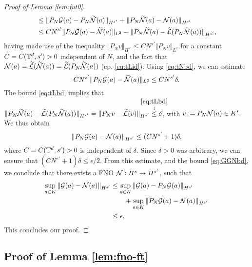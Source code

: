 \documentclass[reqno,a4paper]{amsart}
\begin{document}
\begin{proof}[Proof of Lemma \ref{lem:fut0}]
\begin{align*}
&\le
\Vert P_N \mathcal{G}(a) - P_N\widetilde{\mathcal{N}}(a) \Vert_{H^{s'}}
 + \Vert P_N \widetilde{\mathcal{N}}(a) - \mathcal{N}(a) \Vert_{H^{s'}}
\\
&\le
CN^{s'}\Vert P_N \mathcal{G}(a) - \widetilde{\mathcal{N}}(a) \Vert_{L^2}
 + \Vert P_N \widetilde{\mathcal{N}}(a) - \widetilde{\mathcal{L}}(P_N\widetilde{\mathcal{N}}(a)) \Vert_{H^{s'}},
\end{align*}	
having made use of the inequality $\Vert P_Nv \Vert_{H^{s'}} \le CN^{s'}\Vert P_N v\Vert_{L^2}$ for a constant $C = C(\mathbb{T}^d,s')>0$ independent of $N$, and the fact that $\mathcal{N}(a) = \widetilde{\mathcal{L}}(\widetilde{\mathcal{N}}(a)) = \widetilde{\mathcal{L}}(P_N\widetilde{\mathcal{N}}(a))$ (cp. \eqref{eq:tLid}). Using \eqref{eq:tNbd}, we can estimate
\[
CN^{s'}\Vert P_N \mathcal{G}(a) - \widetilde{\mathcal{N}}(a) \Vert_{L^2} \le CN^{s'} \delta.
\]
The bound \eqref{eq:tLbd} implies that $\Vert P_N \tN(a) - \tL(P_N\tN(a)) \Vert_{H^{s'}}=\Vert P_N v - \tL(v) \Vert_{H^{s'}} 
\explain{\le}{\eqref{eq:tLbd}} \delta$, with $v:= P_N\mathcal{N}(a) \in K'$. We thus obtain
\begin{align}
\Vert P_N \mathcal{G}(a) - \mathcal{N}(a) \Vert_{H^{s'}} \le (CN^{s'} + 1) \delta,
\end{align}
where $C = C(\mathbb{T}^d,s')>0$ is independent of $\delta$. Since $\delta>0$ was arbitrary, we can ensure that $(CN^{s'} + 1)\delta \le \epsilon/2$. From this estimate, and the bound \eqref{eq:GGNbd}, we conclude that there exists a FNO $\mathcal{N}: H^{s}\to H^{s'}$, such that
\begin{align*}
\sup_{a\in K}\Vert \mathcal{G}(a) - \mathcal{N}(a) \Vert_{H^{s'}} 
&\le 
\sup_{a\in K}\Vert \mathcal{G}(a) - P_N\mathcal{G}(a) \Vert_{H^{s'}} \\
&\qquad + \sup_{a\in K}\Vert P_N\mathcal{G}(a) - \mathcal{N}(a) \Vert_{H^{s'}} 
\\
&\le \epsilon,
\end{align*}
This concludes our proof.
\end{proof}



\subsection{Proof of Lemma \ref{lem:fno-ft}}
\label{app:pfut1}
\end{document}
